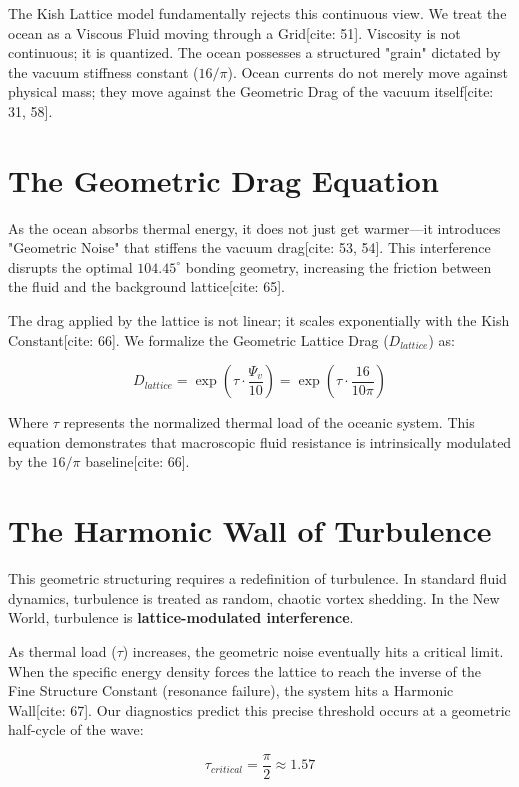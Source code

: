 \documentclass[11pt, letterpaper, openany]{book}
\begin{document}
The Kish Lattice model fundamentally rejects this continuous view. We treat the ocean as a Viscous Fluid moving through a Grid[cite: 51]. Viscosity is not continuous; it is quantized. The ocean possesses a structured "grain" dictated by the vacuum stiffness constant ($16/\pi$). Ocean currents do not merely move against physical mass; they move against the Geometric Drag of the vacuum itself[cite: 31, 58].



\section{The Geometric Drag Equation}
As the ocean absorbs thermal energy, it does not just get warmer—it introduces "Geometric Noise" that stiffens the vacuum drag[cite: 53, 54]. This interference disrupts the optimal $104.45^\circ$ bonding geometry, increasing the friction between the fluid and the background lattice[cite: 65]. 

The drag applied by the lattice is not linear; it scales exponentially with the Kish Constant[cite: 66]. We formalize the Geometric Lattice Drag ($D_{lattice}$) as:

\begin{equation}
D_{lattice} = \exp\left( \tau \cdot \frac{\Psi_v}{10} \right) = \exp\left( \tau \cdot \frac{16}{10\pi} \right)
\end{equation}

Where $\tau$ represents the normalized thermal load of the oceanic system. This equation demonstrates that macroscopic fluid resistance is intrinsically modulated by the $16/\pi$ baseline[cite: 66].

\section{The Harmonic Wall of Turbulence}
This geometric structuring requires a redefinition of turbulence. In standard fluid dynamics, turbulence is treated as random, chaotic vortex shedding. In the New World, turbulence is \textbf{lattice-modulated interference}. 

As thermal load ($\tau$) increases, the geometric noise eventually hits a critical limit. When the specific energy density forces the lattice to reach the inverse of the Fine Structure Constant (resonance failure), the system hits a Harmonic Wall[cite: 67]. Our diagnostics predict this precise threshold occurs at a geometric half-cycle of the wave:

\begin{equation}
\tau_{critical} = \frac{\pi}{2} \approx 1.57
\end{equation}
\end{document}
